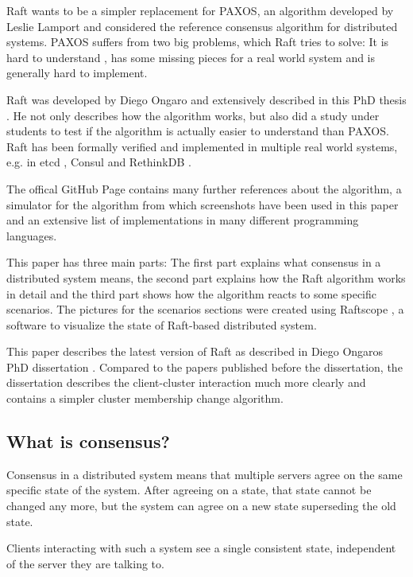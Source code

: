 Raft wants to be a simpler replacement for PAXOS, an algorithm developed by Leslie Lamport and considered the reference consensus algorithm for distributed systems\cite{paxos}. PAXOS suffers from two big problems, which Raft tries to solve: It is hard to understand \cite[p.91]{raft_phd_thesis}, has some missing pieces for a real world system and is generally hard to implement\cite{paxos_made_live}.

Raft was developed by Diego Ongaro and extensively described in this PhD thesis \cite{raft_phd_thesis}. He not only describes how the algorithm works, but also did a study under students to test if the algorithm is actually easier to understand than PAXOS. Raft has been formally verified \cite{raft_proof} and implemented in multiple real world systems, e.g. in etcd \cite{etcd_raft}, Consul \cite{consul_raft} and RethinkDB \cite{rethinkdb_raft}.

The offical GitHub Page \cite{raft_github} contains many further references about the algorithm, a simulator for the algorithm from which screenshots have been used in this paper and an extensive list of implementations in many different programming languages.

This paper has three main parts: The first part explains what consensus in a distributed system means, the second part explains how the Raft algorithm works in detail and the third part shows how the algorithm reacts to some specific scenarios.
The pictures for the scenarios sections were created using Raftscope \cite{raftscope}, a software to visualize the state of Raft-based distributed system.

This paper describes the latest version of Raft as described in Diego Ongaros PhD dissertation \cite{raft_phd_thesis}. Compared to the papers published before the dissertation, the dissertation describes the client-cluster interaction much more clearly and contains a simpler cluster membership change algorithm.

\subsection{What is consensus?}

Consensus in a distributed system means that multiple servers agree on the same specific state of the system. After agreeing on a state, that state cannot be changed any more, but the system can agree on a new state superseding the old state.

Clients interacting with such a system see a single consistent state, independent of the server they are talking to.

